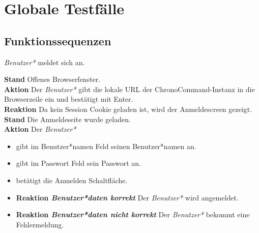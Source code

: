 \section{Globale Testfälle}

\subsection{Funktionssequenzen}
\begin{requirements}
	 \emph{Benutzer*} meldet sich an.
	\begin{requirements}
  			    \textbf{Stand} Offenes Browserfenster. \\
  			    \textbf{Aktion} Der \emph{Benutzer*} gibt die lokale URL der ChronoCommand-Instanz in die Browserzeile ein und bestätigt mit Enter. \\
  			    \textbf{Reaktion} Da kein Session Cookie geladen ist, wird der Anmeldescreen gezeigt.
  			    \textbf{Stand} Die Anmeldeseite wurde geladen.\\
                \textbf{Aktion} Der \emph{Benutzer*}
                    \begin{itemize}
                        \item gibt im Benutzer*namen Feld seinen Benutzer*namen an.
                        \item gibt im Passwort Feld sein Passwort an.
                        \item betätigt die Anmelden Schaltfläche.
                    \end{itemize}
                \begin{itemize}
			\item \textbf{Reaktion \emph{Benutzer*daten korrekt}} Der \emph{Benutzer*} wird angemeldet.
			\item \textbf{Reaktion \emph{Benutzer*daten nicht korrekt}} Der \emph{Benutzer*} bekommt eine Fehlermeldung.
                \end{itemize}


\end{requirements}
\end{requirements}
